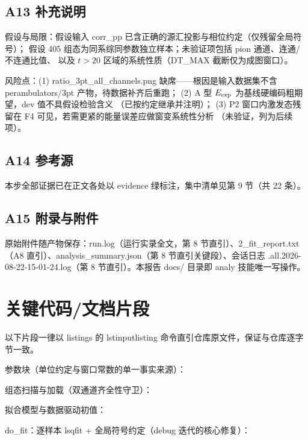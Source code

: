 \documentclass[UTF8]{ctexart}
\begin{document}
\subsection{A13 补充说明}
假设与局限：假设输入 corr\_pp 已含正确的源汇投影与相位约定（仅残留全局符号）；
假设 405 组态为同系综同参数独立样本；未验证项包括 pion 通道、连通/不连通比值、
以及 $t>20$ 区域的系统性质（DT\_MAX 截断仅为成图窗口）。
\begin{warnbox}
风险点：(1) ratio\_3pt\_all\_channels.png 缺席——根因是输入数据集不含
perambulators/3pt 产物，\textcolor{warn}{待数据补齐后重跑}；
(2) A 型 $E_{\rm exp}$ 为基线硬编码粗期望，dev 值不具假设检验含义
（\textcolor{warn}{已按约定继承并注明}）；
(3) P2 窗口内激发态残留在 F4 可见，若需更紧的能量误差应做窗变系统性分析
（\textcolor{warn}{未验证，列为后续项}）。
\end{warnbox}
\subsection{A14 参考源}
本步全部证据已在正文各处以 evidence 绿标注，集中清单见第 9 节（共 22 条）。
\subsection{A15 附录与附件}
原始附件随产物保存：run.log（运行实录全文，第 8 节直引）、2\_fit\_report.txt
（A8 直引）、analysis\_summary.json（第 8 节直引关键段）、会话日志
.all.2026-08-22-15-01-24.log（第 8 节直引）。本报告 docs/ 目录即 analy 技能唯一写操作。

\section{关键代码/文档片段}
以下片段一律以 listings 的 lstinputlisting 命令直引仓库原文件，保证与仓库逐字节一致。

参数块（单位约定与窗口常数的单一事实来源）：


组态扫描与加载（双通道齐全性守卫）：


拟合模型与数据驱动初值：


do\_fit：逐样本 lsqfit + 全局符号约定（debug 迭代的核心修复）：

\end{document}
